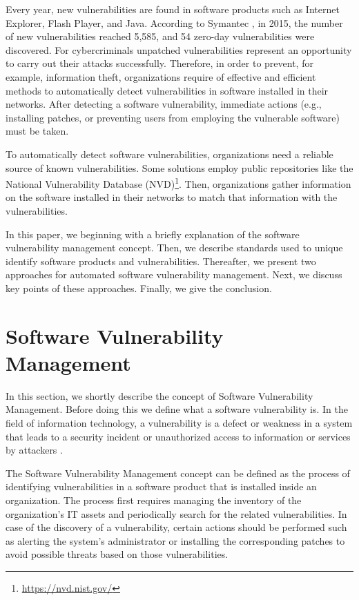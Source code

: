 \documentclass{llncs}
\begin{document}
\par Every year, new vulnerabilities are found in software products such as Internet Explorer, Flash 
 Player, and Java. According to Symantec \cite{symantec}, in 2015, the number of new vulnerabilities 
 reached 5,585, and 54 zero-day vulnerabilities were discovered. For cybercriminals 
 unpatched vulnerabilities represent an opportunity to carry out their attacks successfully. 
 Therefore, in order to prevent, for example, information theft, organizations require of 
 effective and efficient methods to automatically detect vulnerabilities in software installed in 
 their networks. After detecting a software vulnerability, immediate actions (e.g., installing 
 patches, or preventing users from employing the vulnerable software) must be taken. 
 \par To automatically detect software vulnerabilities, organizations need a reliable source of 
 known vulnerabilities. Some solutions employ public repositories like the National 
 Vulnerability Database (NVD)\footnote{\url{https://nvd.nist.gov/}}. Then, organizations gather information on the software 
 installed in their networks to match that information with the vulnerabilities. 
 \par In this paper, we beginning with a briefly explanation of the software vulnerability 
 management concept. Then, we describe standards used to unique identify software products 
 and vulnerabilities. Thereafter, we present two approaches for automated software vulnerability management. Next, we discuss key points of these approaches. Finally, we give the conclusion.
       
\section{Software Vulnerability Management}

In this section, we shortly describe the concept of Software Vulnerability Management. Before doing this we define what a software vulnerability is. In the field of information technology, a vulnerability is a defect or weakness in a system that leads to a security incident or unauthorized access to information or services by attackers \cite{vuln}.  

\par The Software Vulnerability Management concept can be defined as the process of identifying vulnerabilities in a software product that is installed inside an organization. The process first requires managing the inventory of the organization's IT assets and  periodically search for the related vulnerabilities. In case of the discovery of a vulnerability, certain actions should be performed such as alerting the system's administrator or installing the corresponding patches to avoid possible threats based on those vulnerabilities.
\end{document}
